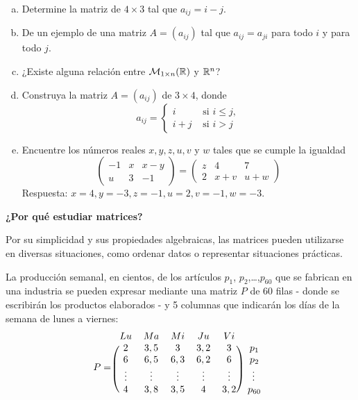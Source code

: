 \begin{ejer}
\begin{enumerate}[(a)]
    \item Determine la matriz de $4\times 3$ tal que $a_{ij}=i-j$.
    \item De un ejemplo de una matriz $A=(a_{ij})$ tal que $a_{ij}=a_{ji}$ para todo $i$ y para todo $j$.
    \item ¿Existe alguna relaci\'on entre $\mathcal{M}_{1\times n}(\mathbb{R})$ y $\mathbb{R}^n$?
    \item Construya la matriz $A = (a_{ij})$ de $3 \times 4$, donde
\[a_{ij}=\left\{\begin{array}{ll}
    i & \text{ si } i\leq j, \\
    i+j & \text{ si } i>j
\end{array}\right.\]
\item Encuentre los n\'umeros reales $x,y,z,u,v$ y $w$ tales que se cumple la igualdad
\[\begin{pmatrix}
   -1& x& x-y \\
  u&3&-1
\end{pmatrix}=\begin{pmatrix}
   z& 4& 7 \\
  2&x+v&u+w
\end{pmatrix}\]
Respuesta: $x = 4, y = -3, z = -1, u = 2, v = -1, w = -3$.
\end{enumerate}
\end{ejer}

\begin{rmk}\textbf{¿Por qu\'e estudiar matrices?}

Por su simplicidad y sus propiedades algebraicas, las matrices pueden utilizarse en diversas situaciones, como ordenar datos o representar situaciones pr\'acticas.

La producción semanal, en cientos, de los artículos $p_1$, $p_2$,\dots ,$p_{60}$ que se fabrican en una industria se pueden expresar mediante una matriz $P$ de 60 filas - donde se escribirán los productos elaborados - y 5 columnas que indicarán los días de la semana de lunes a viernes:
\[
P=\begin{blockarray}{cccccc}
    Lu & Ma & Mi &Ju & Vi \\
\begin{block}{(ccccc)c}
 2& 3,5 & 3 &3,2  & 3 & p_1 \\
  6 & 6,5 & 6,3 & 6,2 & 6 & p_2 \\
  \vdots & \vdots & \vdots & \vdots & \vdots & \vdots \\
  4 & 3,8 & 3,5 & 4 & 3,2 & p_{60} \\
\end{block}
\end{blockarray}
 \]
\end{rmk}

